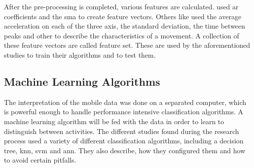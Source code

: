 After the pre-processing is completed, various features are calculated. \textcite[]{khan2010human} used \gls{ar} coefficients and the \gls{sma} to create feature vectors. Others like \textcite[]{kwapisz2011activity} used the average acceleration on each of the three axis, the standard deviation, the time between peaks and other to describe the characteristics of a movement. A collection of these feature vectors are called feature set. These are used by the aforementioned studies to train their algorithms and to test them.

\subsection{Machine Learning Algorithms}
The interpretation of the mobile data was done on a separated computer, which is powerful enough to handle performance intensive classification algorithms. A machine learning algorithm will be fed with the data in order to learn to distinguish between activities. The different studies found during the research process used a variety of different classification algorithms, including a decision tree, \gls{knn}, \gls{svm} and \gls{ann}. They also describe, how they configured them and how to avoid certain pitfalls.
